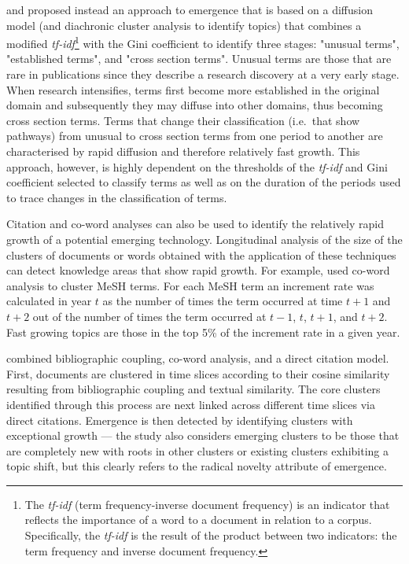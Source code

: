 \documentclass[11pt]{article}
\begin{document}
\cite{Schiebel2010} and \cite{Roche2010} proposed instead an approach to emergence that is based on a diffusion model (and diachronic cluster analysis to identify topics) that combines a modified \textit{tf-idf}\footnote{The \textit{tf-idf} (term frequency-inverse document frequency) is an indicator that reflects the importance of a word to a document in relation to a corpus. Specifically, the \textit{tf-idf} is the result of the product between two indicators: the term frequency and inverse document frequency.} with the Gini coefficient to identify three stages:  "unusual terms", "established terms", and "cross section terms". Unusual terms are those that are rare in publications since they describe a research discovery at a very early stage. When research intensifies, terms first become more established in the original domain and subsequently they may diffuse into other domains, thus becoming cross section terms. Terms that change their classification (i.e.\ that show pathways) from unusual to cross section terms from one period to another are characterised by rapid diffusion and therefore relatively fast growth. This approach, however, is highly dependent on the thresholds of the \textit{tf-idf} and Gini coefficient selected to classify terms as well as on the duration of the periods used to trace changes in the classification of terms.

Citation and co-word analyses can also be used to identify the relatively rapid growth of a potential emerging technology. Longitudinal analysis of the size of the clusters of documents or words obtained with the application of these techniques can detect knowledge areas that show rapid growth. For example, \cite{Ohniwa2010} used co-word analysis to cluster MeSH terms. For each MeSH term an increment rate was calculated in year $t$ as the number of times the term occurred at time $t+1$ and $t+2$ out of the number of times the term occurred at $t-1$, $t$, $t+1$, and $t+2$. Fast growing topics are those in the top 5\% of the increment rate in a given year. 

\cite{Glanzel2012} combined bibliographic coupling, co-word analysis, and a direct citation model. First, documents are clustered in time slices according to their cosine similarity resulting from bibliographic coupling and textual similarity. The core clusters identified through this process are next linked across different time slices via direct citations. Emergence is then detected by identifying clusters with exceptional growth --- the study also considers emerging clusters to be those that are completely new with roots in other clusters or existing clusters exhibiting a topic shift, but this clearly refers to the radical novelty attribute of emergence. 
\end{document}
